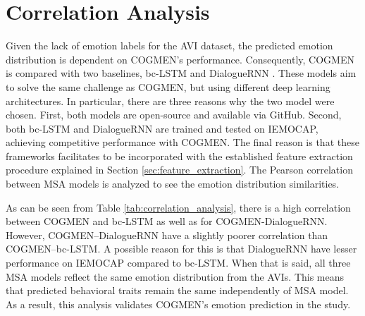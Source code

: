 \section{Correlation Analysis}
Given the lack of emotion labels for the AVI dataset, the predicted emotion distribution is dependent on COGMEN's performance. Consequently, COGMEN is compared with two baselines, bc-LSTM\cite{bc-LSTM_poria2017context} and DialogueRNN \cite{DialogueRNN_MAJUMDER2018124}. These models aim to solve the same challenge as COGMEN, but using different deep learning architectures. In particular, there are three reasons why the two model were chosen. First, both models are open-source and available via GitHub. Second, both bc-LSTM and DialogueRNN are trained and tested on IEMOCAP, achieving competitive performance with COGMEN. The final reason is that these frameworks facilitates to be incorporated with the established feature extraction procedure explained in Section \ref{sec:feature_extraction}. The Pearson correlation between MSA models is analyzed to see the emotion distribution similarities. 
%
\begin{table}[h]
\caption{Correlation for emotions distribution between MSA models.}
\centering
{}
\label{tab:correlation_analysis}
\end{table}
%
As can be seen from Table \ref{tab:correlation_analysis}, there is a high correlation between COGMEN and bc-LSTM as well as for COGMEN-DialogueRNN. However, COGMEN--DialogueRNN have a slightly poorer correlation than COGMEN--bc-LSTM. A possible reason for this is that DialogueRNN have lesser performance on IEMOCAP compared to bc-LSTM. When that is said, all three MSA models reflect the same emotion distribution from the AVIs. This means that predicted behavioral traits remain the same independently of MSA model. As a result, this analysis validates COGMEN's emotion prediction in the study. 

